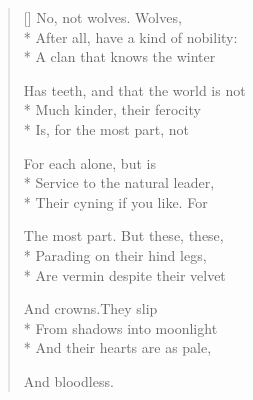 \label{ch:lear_au}
\settowidth{\versewidth}{Has teeth, and that the world is not}
\begin{verse}[\versewidth]
No, not wolves.   Wolves,\\*
After all, have a kind of nobility:\\*
A clan that knows the winter

Has teeth, and that the world is not\\*
Much kinder, their ferocity\\*
Is, for the most part, not

For each alone, but is\\*
Service to the natural leader,\\*
Their cyning if you like. For

The most part.  But these, these,\\*
Parading on their hind legs,\\*
Are vermin despite their velvet

And crowns.\qquad They slip\\*
From shadows into moonlight\\*
And their hearts are as pale,

And bloodless.
\end{verse}
